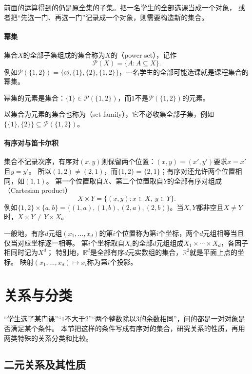 前面的运算得到的仍是原全集的子集。把一名学生的全部选课当成一个对象，
或者把“先选一门、再选一门”记录成一个对象，则需要构造新的集合。

\paragraph{幂集}
集合$X$的全部子集组成的集合称为$X$的（power set），记作
\[
 \mathcal P(X)=\{A:A\subseteq X\}.
\]
例如$\mathcal P(\{1,2\})=\{\varnothing,\{1\},\{2\},\{1,2\}\}$，一名学生的全部可能选课就是课程集合的幂集。

幂集的元素是集合：$\{1\}\in\mathcal P(\{1,2\})$，而$1$不是$\mathcal P(\{1,2\})$的元素。

以集合为元素的集合也称为（set family），它不必收集全部子集，例如$\{\{1\},\{2\}\}\subseteq\mathcal P(\{1,2\})$。

\paragraph{有序对与笛卡尔积}
集合不记录次序，有序对$(x,y)$则保留两个位置：$(x,y)=(x',y')$要求$x=x'$且$y=y'$。
所以$(1,2)\neq(2,1)$，而$\{1,2\}=\{2,1\}$；有序对还允许两个位置相同，如$(1,1)$。
第一个位置取自$X$、第二个位置取自$Y$的全部有序对组成（Cartesian product）
\[
 X\times Y=\{(x,y):x\in X,\ y\in Y\}.
\]
例如$\{1,2\}\times\{a,b\}=\{(1,a),(1,b),(2,a),(2,b)\}$。当$X,Y$都非空且$X\neq Y$时，$X\times Y\neq Y\times X$。

一般地，有序$d$元组$(x_1,\ldots,x_d)$的第$i$个位置称为第$i$个坐标，两个$d$元组相等当且仅当对应坐标逐一相等。
第$i$个坐标取自$X_i$的全部$d$元组组成$X_1\times\cdots\times X_d$，各因子相同时记为$X^d$；
特别地，$\mathbb R^d$是全部有序$d$元实数组的集合，$\mathbb R^2$就是平面上点的坐标。
映射$(x_1,\ldots,x_d)\mapsto x_i$称为第$i$个投影。

\section{关系与分类}
\label{sec:prelim-binary-relations}

“学生选了某门课”“$1$不大于$2$”“两个整数除以$3$的余数相同”，问的都是一对对象是否满足某个条件。
本节把这样的条件写成有序对的集合，研究关系的性质，再用两类特殊的关系分类和比较。

\subsection{二元关系及其性质}
\label{sec:prelim-binary-relation-definition}
\label{sec:prelim-relation-properties}

